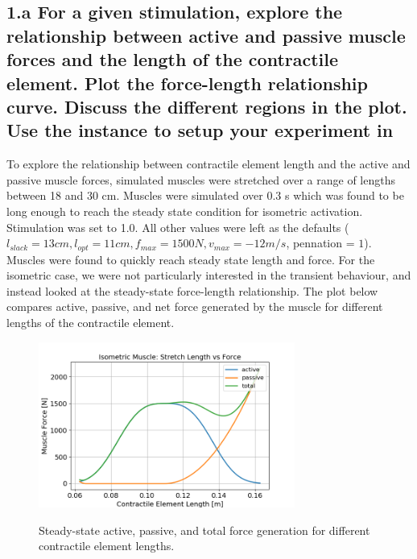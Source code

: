 \documentclass{cmc}
\begin{document}
\subsection*{1.a For a given stimulation, explore the relationship
  between active and passive muscle forces and the length of the
  contractile element.  Plot the force-length relationship curve.
  Discuss the different regions in the plot. Use the
   instance
  to setup your experiment in }

To explore the relationship between contractile element length and the active and passive muscle forces, simulated muscles were stretched over a range of lengths between 18 and 30 cm. Muscles were simulated over 0.3 s which was found to be long enough to reach the steady state condition for isometric activation. Stimulation was set to 1.0. All other values were left as the defaults ($l_{slack} = 13 cm, l_{opt} = 11 cm, f_{max} = 1500 N, v_{max} = -12 m/s$, pennation = $1$). Muscles were found to quickly reach steady state length and force. For the isometric case, we were not particularly interested in the transient behaviour, and instead looked at the steady-state force-length relationship. The plot below compares active, passive, and net force generated by the muscle for different lengths of the contractile element.

\begin{figure}[H]
  \centering
    { \centering
      \includegraphics[width=0.75\textwidth]{1a/1a.png}}
    \caption{Steady-state active, passive, and total force generation for different contractile element lengths.}
    \label{fig:f-vs-L}
\end{figure}
\end{document}
